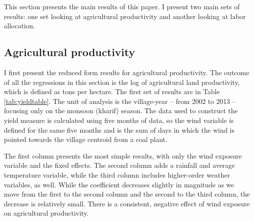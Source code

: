 \documentclass[
]{article}
\begin{document}
\label{results}

This section presents the main results of this paper. I present two main sets of results: one set looking at agricultural productivity and another looking at labor allocation.

\hypertarget{agricultural-productivity}{%
\subsection{Agricultural productivity}\label{agricultural-productivity}}

I first present the reduced form results for agricultural productivity. The outcome of all the regressions in this section is the log of agricultural land productivity, which is defined as tons per hectare. The first set of results are in Table \ref{tab:yieldtable}. The unit of analysis is the village-year -- from 2002 to 2013 -- focusing only on the monsoon (kharif) season. The data used to construct the yield measure is calculated using five months of data, so the wind variable is defined for the same five months and is the sum of days in which the wind is pointed towards the village centroid from a coal plant.

The first column presents the most simple results, with only the wind exposure variable and the fixed effects. The second column adds a rainfall and average temperature variable, while the third column includes higher-order weather variables, as well. While the coefficient decreases slightly in magnitude as we move from the first to the second column and the second to the third column, the decrease is relatively small. There is a consistent, negative effect of wind exposure on agricultural productivity.
\end{document}
